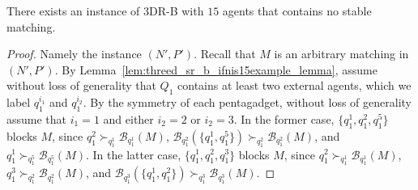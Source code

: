 
\begin{thm}
\label{thm:threed_sr_b_ifnis15thensmdoesnotexist}
There exists an instance of 3DR-B with $15$ agents that contains no stable matching.
\end{thm}
\begin{proof}
Namely the instance $(N', P')$. Recall that $M$ is an arbitrary matching in $(N', P')$. By Lemma~\ref{lem:threed_sr_b_ifnis15example_lemma}, assume without loss of generality that $Q_1$ contains at least two external agents, which we label $q_1^{i_1}$ and $q_1^{i_2}$. By the symmetry of each pentagadget, without loss of generality assume that $i_1 = 1$ and either $i_2 = 2$ or $i_2 = 3$. In the former case, $\{ q_1^1, q_1^2, q_1^5 \}$ blocks $M$, since $q_1^2 \succ_{q_1^1} \mathscr{B}_{q_1^1}(M)$, $\mathscr{B}_{q_1^2}(\{ q_1^1, q_1^5 \}) \succ_{q_1^2} \mathscr{B}_{q_1^2}(M)$, and $q_1^1 \succ_{q_1^5} \mathscr{B}_{q_1^5}(M)$. In the latter case, $\{ q_1^1, q_1^2, q_1^3 \}$ blocks $M$, since $q_1^2 \succ_{q_1^1} \mathscr{B}_{q_1^1}(M)$, $q_1^3 \succ_{q_1^2} \mathscr{B}_{q_1^2}(M)$, and $\mathscr{B}_{q_1^3}(\{ q_1^1, q_1^2 \}) \succ_{q_1^3} \mathscr{B}_{q_1^3}(M)$.
\end{proof}
